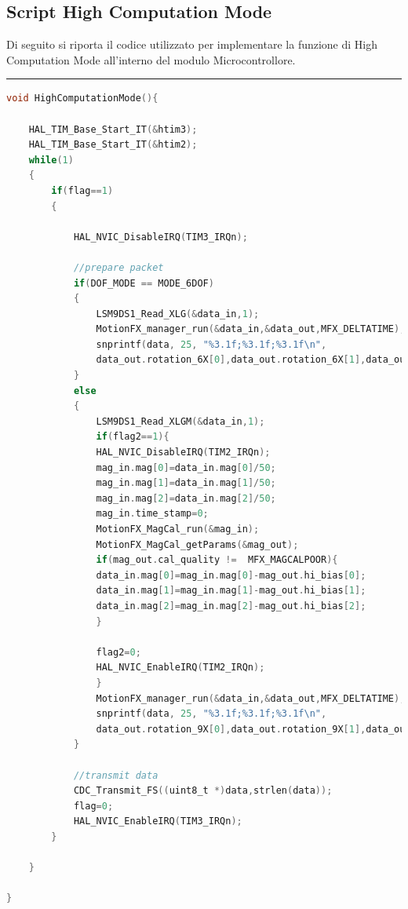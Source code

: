 \subsection{Script High Computation Mode}
\label{app:hcm}
Di seguito si riporta il codice utilizzato per implementare la funzione di High Computation Mode all'interno del modulo Microcontrollore.\\
\noindent\rule{14.1cm}{0.4pt}
\begin{lstlisting}[language=C]
void HighComputationMode(){

	HAL_TIM_Base_Start_IT(&htim3);
	HAL_TIM_Base_Start_IT(&htim2);
	while(1)
	{
		if(flag==1)
		{

			HAL_NVIC_DisableIRQ(TIM3_IRQn);

			//prepare packet
			if(DOF_MODE == MODE_6DOF)
			{
				LSM9DS1_Read_XLG(&data_in,1);
				MotionFX_manager_run(&data_in,&data_out,MFX_DELTATIME);
				snprintf(data, 25, "%3.1f;%3.1f;%3.1f\n",
				data_out.rotation_6X[0],data_out.rotation_6X[1],data_out.rotation_6X[2]);
			}
			else
			{
				LSM9DS1_Read_XLGM(&data_in,1);
				if(flag2==1){
				HAL_NVIC_DisableIRQ(TIM2_IRQn);
				mag_in.mag[0]=data_in.mag[0]/50;
				mag_in.mag[1]=data_in.mag[1]/50;
				mag_in.mag[2]=data_in.mag[2]/50;
				mag_in.time_stamp=0;
				MotionFX_MagCal_run(&mag_in);
				MotionFX_MagCal_getParams(&mag_out);
				if(mag_out.cal_quality !=  MFX_MAGCALPOOR){
				data_in.mag[0]=mag_in.mag[0]-mag_out.hi_bias[0];
				data_in.mag[1]=mag_in.mag[1]-mag_out.hi_bias[1];
				data_in.mag[2]=mag_in.mag[2]-mag_out.hi_bias[2];
				}
				
				flag2=0;
				HAL_NVIC_EnableIRQ(TIM2_IRQn);
				}
				MotionFX_manager_run(&data_in,&data_out,MFX_DELTATIME);
				snprintf(data, 25, "%3.1f;%3.1f;%3.1f\n",
				data_out.rotation_9X[0],data_out.rotation_9X[1],data_out.rotation_9X[2]);
			}

			//transmit data
			CDC_Transmit_FS((uint8_t *)data,strlen(data));
			flag=0;
			HAL_NVIC_EnableIRQ(TIM3_IRQn);
		}

	}

}

\end{lstlisting}


